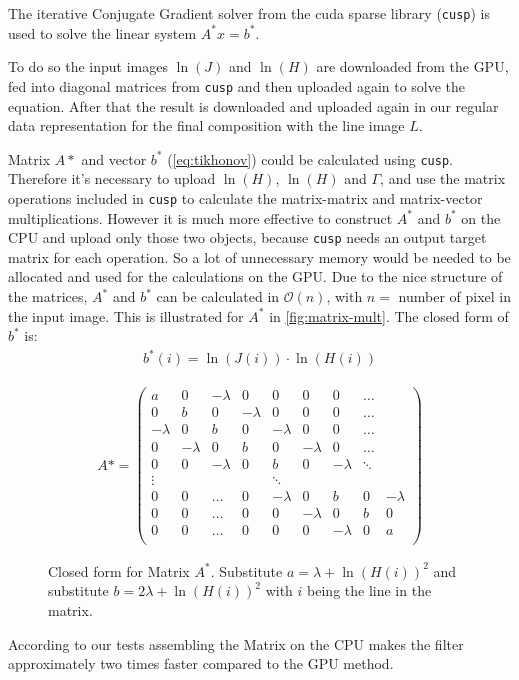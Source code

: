 The iterative Conjugate Gradient solver from the cuda sparse library
(\texttt{cusp}) is used to solve the linear system $A^* x = b^*$.

To do so the input images $\ln(J)$ and $\ln(H)$ are downloaded from the GPU,
fed into diagonal matrices from \texttt{cusp} and then uploaded again to solve the
equation. After that the result is downloaded and uploaded again in our regular
data representation for the final composition with the line image $L$.

Matrix $A*$ and vector $b^*$ (\autoref{eq:tikhonov}) could be calculated using
\texttt{cusp}. Therefore it's necessary to upload $\ln(H)$, $\ln(H)$ and $\Gamma$, and
use the matrix operations included in \texttt{cusp} to calculate the
matrix-matrix and matrix-vector multiplications. However it is much more
effective to construct $A^*$ and $b^*$ on the CPU and upload only those two
objects, because \texttt{cusp} needs an output target matrix for each operation.
So a lot of unnecessary memory would be needed to be allocated and used for the
calculations on the GPU. Due to the nice structure of the matrices, $A^*$ and
$b^*$  can be
calculated in $\mathcal{O}(n)$, with $n =$ number of pixel in the input image.
This is illustrated for $A^*$ in \autoref{fig:matrix-mult}. The closed form of
$b^*$ is:
\begin{align*}
  b^*(i) = \ln(J(i)) \cdot \ln(H(i))
\end{align*}

\begin{figure}[htb]
  \centering
  {\small
  \begin{align*}
    A*= \begin{pmatrix}
      a & 0 & -\lambda & 0 & 0 & 0 & 0 & \dots\\
      0 & b & 0 & -\lambda & 0 & 0 & 0 & \dots\\
      -\lambda & 0 & b & 0 & -\lambda & 0 & 0 & \dots\\
      0 & -\lambda & 0 & b & 0 & -\lambda & 0 & \dots\\
      0 & 0 & -\lambda & 0 & b & 0 & -\lambda & \ddots\\
      \vdots& &  &  &\ddots  \\
      0 & 0 & \dots & 0 & -\lambda & 0 & b & 0 & -\lambda\\
      0 & 0 & \dots & 0 & 0 &-\lambda & 0 & b & 0\\
      0 & 0 & \dots & 0 & 0 & 0 &-\lambda & 0 & a \\
    \end{pmatrix}
  \end{align*}
}
  \caption{Closed form for Matrix $A^*$. Substitute $a = \lambda +
  \ln(H(i))^2$ and substitute $b = 2\lambda + \ln(H(i))^2$ with $i$ being the line
in the matrix.}
  \label{fig:matrix-mult}
\end{figure}

According to our tests assembling the Matrix on the CPU makes the filter
approximately two times faster compared to the GPU method.
